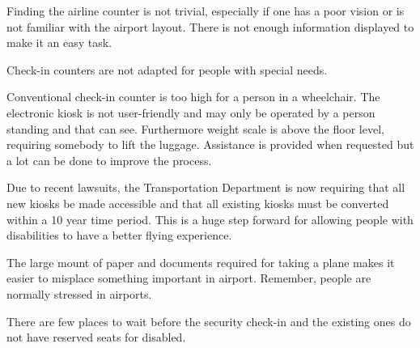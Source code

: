 \begin{list}{-}{}
  \item Finding the airline counter is not trivial, especially if one has a poor vision or is not familiar with the airport layout. There is not enough information displayed to make it an easy task.
  \item Check-in counters are not adapted for people with special needs. 
  \item Conventional check-in counter is too high for a person in a wheelchair. The electronic kiosk is not user-friendly and may only be operated by a person standing and that can see. Furthermore weight scale is above the floor level, requiring somebody to lift the luggage. Assistance is provided when requested but a lot can be done to improve the process.
  \item Due to recent lawsuits, the Transportation Department is now requiring that all new kiosks be made accessible and that all existing kiosks must be converted within a 10 year time period.  This is a huge step forward for allowing people with disabilities to have a better flying experience.
  \item The large mount of paper and documents required for taking a plane makes it easier to misplace something important in airport. Remember, people are normally stressed in airports.
  \item There are few places to wait before the security check-in and the existing ones do not have reserved seats for disabled.


\end{list}
